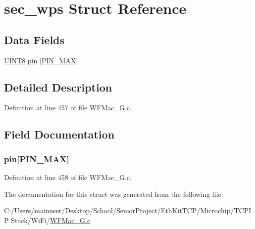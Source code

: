 \hypertarget{structsec__wps}{}\section{sec\+\_\+wps Struct Reference}
\label{structsec__wps}
\subsection*{Data Fields}
\begin{DoxyCompactItemize}
\item 
\hyperlink{_generic_type_defs_8h_ab27e9918b538ce9d8ca692479b375b6a}{U\+I\+N\+T8} \hyperlink{structsec__wps_a583f59554408af1836779d43ad986b04}{pin} \mbox{[}\hyperlink{_w_f_mac__24_g_8c_ac5b95f02723021833cc47477b06a962ca517c727c7d72dd5269105ce55a67c6ce}{P\+I\+N\+\_\+\+M\+A\+X}\mbox{]}
\end{DoxyCompactItemize}


\subsection{Detailed Description}


Definition at line 457 of file W\+F\+Mac\+\_\+G.\+c.



\subsection{Field Documentation}
\hypertarget{structsec__wps_a583f59554408af1836779d43ad986b04}{}
\subsubsection[{pin}]{ pin\mbox{[}{\bf P\+I\+N\+\_\+\+M\+A\+X}\mbox{]}}\label{structsec__wps_a583f59554408af1836779d43ad986b04}


Definition at line 458 of file W\+F\+Mac\+\_\+G.\+c.



The documentation for this struct was generated from the following file\+:\begin{DoxyCompactItemize}
\item 
C\+:/\+Users/mainuser/\+Desktop/\+School/\+Senior\+Project/\+Eth\+Kit\+T\+C\+P/\+Microchip/\+T\+C\+P\+I\+P Stack/\+Wi\+Fi/\hyperlink{_w_f_mac__24_g_8c}{W\+F\+Mac\+\_\+G.\+c}\end{DoxyCompactItemize}
